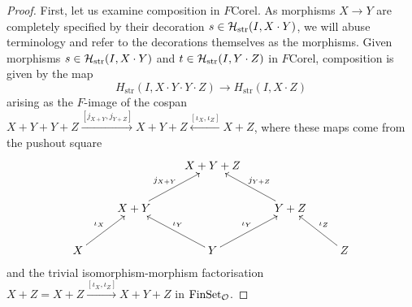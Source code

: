 \begin{proof}
  First, let us examine composition in $F\mathrm{Corel}$. As morphisms $X \to Y$
  are completely specified by their decoration $s \in \mathcal
  H_{\mathrm{str}}(I,X\cdot Y)$, we will abuse terminology and refer to the
  decorations themselves as the morphisms.  Given morphisms $s \in \mathcal
  H_{\mathrm{str}}(I,X\cdot Y)$ and $t \in \mathcal H_{\mathrm{str}}(I,Y\cdot Z)$ in
  $F\mathrm{Corel}$, composition is given by the map 
  \[
    H_{\mathrm{str}}(I,X\cdot Y\cdot Y\cdot Z) \to H_{\mathrm{str}}(I,X\cdot Z)
  \]
  arising as the $F$-image of the cospan $X+Y+Y+Z
  \xrightarrow{[j_{X+Y},j_{Y+Z}]} X+Y+Z \xleftarrow{[\iota_X,\iota_Z]} X+Z$,
  where these maps come from the pushout square
  \[
    \xymatrix{
      && X+Y+Z \\
      & X+Y \ar[ur]^{j_{X+Y}} && Y+Z \ar[ul]_{j_{Y+Z}} \\
      X \ar[ur]^{\iota_X} && Y \ar[ul]_{\iota_Y} \ar[ur]^{\iota_Y} && Z
      \ar[ul]_{\iota_Z}
    }
  \]
  and the trivial isomorphism-morphism factorisation $X+Z = X+Z
  \xrightarrow{[\iota_X,\iota_Z]} X+Y+Z$ in $\mathrm{FinSet}_{\mathcal O}$.
  

\end{proof}
